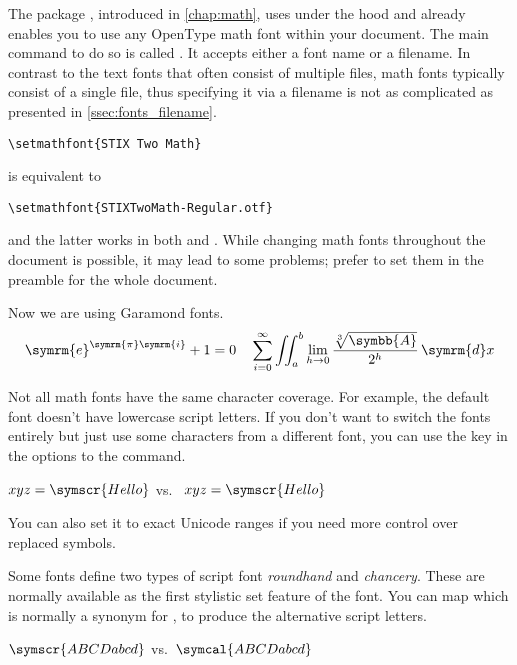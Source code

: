 The package , introduced in \autoref{chap:math}, uses
 under the hood and already enables you to use any OpenType math
font within your document. The main command to do so is called
. It accepts either a font name or a filename. In contrast to
the text fonts that often consist of multiple files, math fonts typically
consist of a single file, thus specifying it via a filename is not as
complicated as presented in \autoref{ssec:fonts_filename}.
\begin{code}
  \begin{verbatim}
\setmathfont{STIX Two Math}
  \end{verbatim}
\end{code}
is equivalent to
\begin{code}
  \begin{verbatim}
\setmathfont{STIXTwoMath-Regular.otf}
  \end{verbatim}
\end{code}
and the latter works in both  and . While
changing math fonts throughout the document is possible, it may lead to some
problems; prefer to set them in the preamble for the whole document.
\begin{example}[standalone, paperheight=2.5cm, paperwidth=6cm]
\usepackage{unicode-math}%
\setmainfont{EB Garamond}

\noindent %
Now we are using Garamond fonts.
\[
  \symrm{e}^{\symrm{\pi}
    \symrm{i}} + 1 = 0 \quad
  \sum_{i=0}^\infty \iint_a^b
  \lim_{h\to0}\frac{\sqrt[3]{
    \symbb{A}}}{2^h}\,\symrm{d}x
\]
\end{example}

Not all math fonts have the same character coverage. For example, the default
font doesn't have lowercase script letters. If you don't want to switch the
fonts entirely but just use some characters from a different font, you
can use the  key in the options to the  command.
\begin{example}[standalone, paperheight=1cm, paperwidth=6cm]
\usepackage{unicode-math}%
\noindent %
\(xyz = \symscr{Hello}\) vs.\
\(xyz = \symscr{Hello}\)
\end{example}
You can also set it to exact Unicode ranges if you need more control over
replaced symbols.

Some fonts define two types of script font \emph{roundhand} and \emph{chancery}. These are
normally available as the first stylistic set feature of the font. You can map
\csi{symcal} which is normally a synonym for \csi{symscr}, to produce the
alternative script letters.
\begin{example}[standalone, paperheight=1cm, paperwidth=6cm]
\usepackage{unicode-math}%

\noindent %
\(\symscr{ABCDabcd}\) vs.\
\(\symcal{ABCDabcd}\) 
\end{example}

